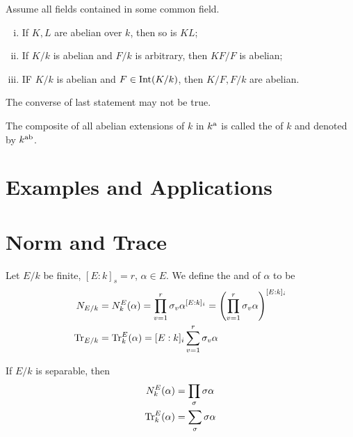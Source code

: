   \begin{thm}
    Assume all fields contained in some common field.
    \begin{enumerate}[(i)]
      \item If $K,L$ are abelian over $k$, then so is $KL$;
      \item If $K/k$ is abelian and $F/k$ is arbitrary, then $KF/F$ is abelian;
      \item IF $K/k$ is abelian and $F\in\operatorname{Int}(K/k)$, then $K/F,F/k$ are abelian.
    \end{enumerate}
  \end{thm}

  \begin{warn}
    The converse of last statement may not be true.
  \end{warn}

  \begin{defn}
    The composite of all abelian extensions of $k$ in $k^{\operatorname{a}}$ is called the  of $k$ and denoted by $k^{\operatorname{ab}}$.
  \end{defn}

\newpage\section{Examples and Applications}

\newpage\section{Norm and Trace}
  Let $E/k$ be finite, $[E:k]_s=r$, $\alpha\in E$. We define the  and  of $\alpha$ to be
  \begin{align*}
    N_{E/k} &= N^E_k(\alpha) = \prod_{v=1}^{r}\sigma_v\alpha^{[E:k]_i} = \left(\prod_{v=1}^r\sigma_v\alpha\right)^{[E:k]_i} \\
    \operatorname{Tr}_{E/k} &= \operatorname{Tr}^E_k(\alpha) = [E:k]_i\sum_{v=1}^r\sigma_v\alpha
  \end{align*}

  If $E/k$ is separable, then
  \begin{align*}
    N^E_k(\alpha) & =\prod_{\sigma}\sigma\alpha \\
    \operatorname{Tr}^E_k(\alpha) & = \sum_{\sigma}\sigma\alpha
  \end{align*}

